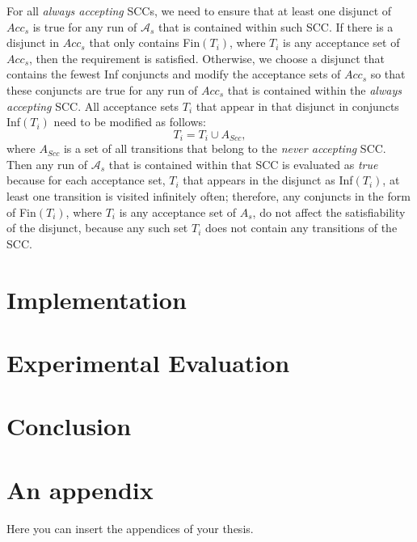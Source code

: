 \documentclass[
  digital, %
  twoside, %
  table,   %
  lof,     %
  lot,     %
]{fithesis3}
\begin{document}
For all \emph{always accepting} SCCs, we need to ensure that at least one disjunct of $Acc_s$ is true for any run of $\mathcal{A}_s$ that is contained within such SCC. If there is a disjunct in $Acc_s$ that only contains Fin$(T_i)$, where $T_i$ is any acceptance set of $Acc_s$, then the requirement is satisfied. Otherwise, we choose a disjunct that contains the fewest Inf conjuncts and modify the acceptance sets of $Acc_s$ so that these conjuncts are true for any run of $Acc_s$ that is contained within the \emph{always accepting} SCC. All acceptance sets $T_i$ that appear in that disjunct in conjuncts Inf$(T_i)$ need to be modified as follows:
\begin{equation*}
  T_i = T_i \cup A_{Scc},
\end{equation*}
where $A_{Scc}$ is a set of all transitions that belong to the \emph{never accepting} SCC. Then any run of $\mathcal{A}_s$ that is contained within that SCC is evaluated as \emph{true} because for each acceptance set, $T_i$ that appears in the disjunct as Inf$(T_i)$, at least one transition is visited infinitely often; therefore, any conjuncts in the form of Fin$(T_i)$, where $T_i$ is any acceptance set of $A_s$, do not affect the satisfiability of the disjunct, because any such set $T_i$ does not contain any transitions of the SCC.

\chapter{Implementation}

\chapter{Experimental Evaluation}

\chapter{Conclusion}

\printbibliography[heading=bibintoc]

\makeatletter\thesis@blocks@clear\makeatother
{}
{} 
\printindex

\appendix
\chapter{An appendix}
Here you can insert the appendices of your thesis.
\end{document}

